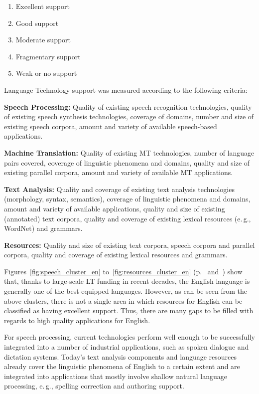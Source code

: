 \begin{multicols}{2}
\begin{enumerate}
\item Excellent support
\item Good support
\item Moderate support
\item Fragmentary support
\item Weak or no support
\end{enumerate}

Language Technology support was measured according to the following criteria:

\textbf{Speech Processing:} Quality of existing speech recognition technologies, quality of existing speech synthesis technologies, coverage of domains, number and size of existing speech corpora, amount and variety of available speech-based applications.

\textbf{Machine Translation:} Quality of existing MT technologies, number of language pairs covered, coverage of linguistic phenomena and domains, quality and size of existing parallel corpora, amount and variety of available MT applications.

\textbf{Text Analysis:} Quality and coverage of existing text analysis technologies (morphology, syntax, semantics), coverage of linguistic phenomena and domains, amount and variety of available applications, quality and size of existing (annotated) text corpora, quality and coverage of existing lexical resources (e.\,g., WordNet) and grammars.

\textbf{Resources:} Quality and size of existing text corpora, speech corpora and parallel corpora, quality and coverage of existing lexical resources and grammars.

Figures~\ref{fig:speech_cluster_en} to~\ref{fig:resources_cluster_en} (p.~\pageref{fig:speech_cluster_en} and~\pageref{fig:resources_cluster_en}) show that, thanks to large-scale LT funding in recent decades, the English language is generally one of the best-equipped languages. However, as can be seen from the above clusters, there is not a single area in which resources for English can be classified as having excellent support. Thus, there are many gaps to be filled with regards to high quality applications for English.

For speech processing, current technologies perform well enough to be successfully integrated into a number of industrial applications, such as spoken dialogue and dictation systems. Today’s text analysis components and language resources already cover the linguistic phenomena of English to a certain extent and are integrated into applications that mostly involve shallow natural language processing, e.\,g., spelling correction and authoring support.


\end{multicols}
